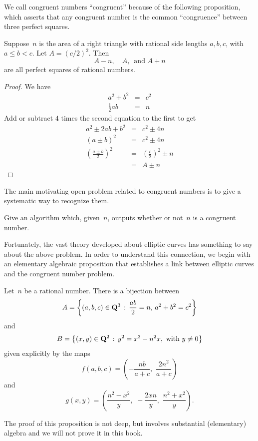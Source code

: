  We call congruent
numbers ``congruent'' because of the following proposition,
which asserts that any congruent number is the common
``congruence'' between three perfect squares.
\begin{proposition}
Suppose~$n$ is the area of a right
triangle with rational side lengths $a, b, c$, with
$a\leq b<c$.
Let $A=(c/2)^2$.  Then
$$A-n, \quad A,\, \text{ and } A+n$$
are all perfect squares of rational numbers.
\end{proposition}
\begin{proof}
We have
\begin{eqnarray*}
a^2+b^2&=&c^2\\
\frac{1}{2}ab&=&n
\end{eqnarray*}
Add or subtract $4$ times the second equation to the first to get
\begin{eqnarray*}
a^2\pm2ab +b^2&=&c^2\pm 4n\\
(a\pm b)^2 &=& c^2 \pm 4n\\
\left(\frac{a\pm b}{2}\right)^2 &=&
   \left( \frac{c}{2}\right)^2 \pm n \\
  &=& A \pm n
\end{eqnarray*}
\end{proof}

The main motivating open problem related to congruent numbers
is to give a systematic way to recognize them.
\begin{openproblem}\label{prob:cong}
Give an algorithm which, given~$n$, outputs whether or
not~$n$ is a congruent number.
\end{openproblem}

Fortunately, the vast theory developed about elliptic curves
has something to say about the above problem.  In order to understand
this connection, we begin with an elementary algebraic proposition
that establishes a link between elliptic curves
and the congruent number problem.
\begin{proposition}\label{prop:congbij}%
Let~$n$ be a rational number.   There is a bijection between
$$
 A = \left\{(a,b,c) \in \mathbf{Q}^3 \,:\, \frac{ab}{2} = n,\, a^2 + b^2 = c^2\right\}
$$
and
$$
 B = \left\{(x,y) \in \mathbf{Q}^2 \,:\, y^2 = x^3 - n^2 x, \,\,\text{\rm with } y \neq 0\right\}
$$
given explicitly by the maps
$$
  f(a,b,c) = \left(-\frac{nb}{a+c},\,\, \frac{2n^2}{a+c}\right)
$$
and
$$
  g(x,y) = \left(\frac{n^2-x^2}{y},\,\,
                         -\frac{2xn}{y},\,\, \frac{n^2+x^2}{y}\right).
$$
\end{proposition}
The proof of this proposition is not deep, but involves substantial
(elementary) algebra and we will not prove it in this book.

